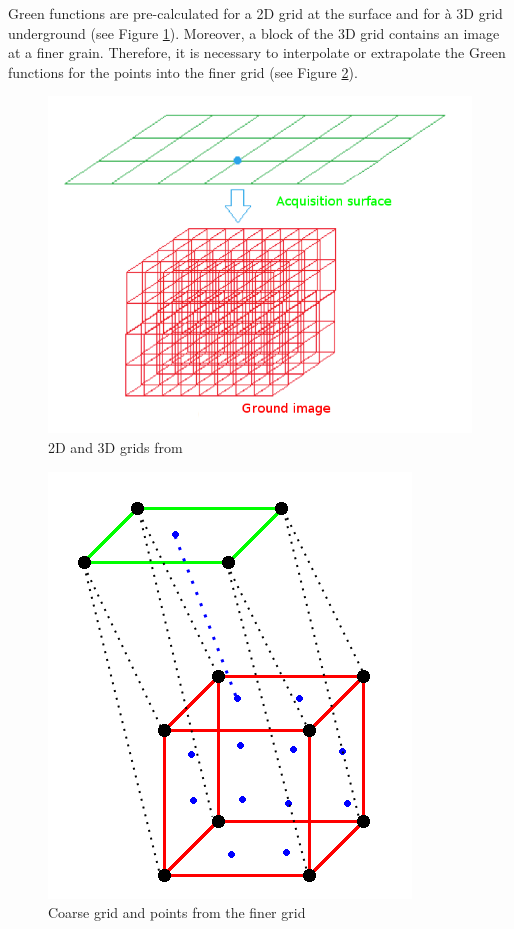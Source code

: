Green functions are pre-calculated for a 2D grid at the surface and for à 3D grid underground (see Figure \ref{fig:grids}).
Moreover, a block of the 3D grid contains an image at a finer grain.
Therefore, it is necessary to interpolate or extrapolate the Green functions for the points into the finer grid (see Figure \ref{fig:fine_coarse_grid}).

\begin{figure}[H]
	\centering
	\includegraphics[width=.55\textwidth]{figure8rapportP2}
	\caption{2D and 3D grids \label{fig:grids} from \cite{rapport_Total_Petiton}}
\end{figure}

\begin{figure}[H]
	\centering
	\includegraphics[width=.55\textwidth]{fctGreenInterpolation}
	\caption{Coarse grid and points from the finer grid \label{fig:fine_coarse_grid}}
\end{figure}

